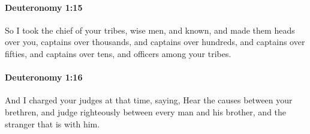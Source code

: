 		\paragraph{Deuteronomy 1:15} %
			\label{DEUTERONOMY-1-15}

			So I took the chief of your tribes, wise men, and known, and made them heads over you, captains over thousands, and captains over hundreds, and captains over fifties, and captains over tens, and officers among your tribes.


		\paragraph{Deuteronomy 1:16} %
			\label{DEUTERONOMY-1-16}

			And I charged your judges at that time, saying, Hear the causes between your brethren, and judge righteously between every man and his brother, and the stranger that is with him.

